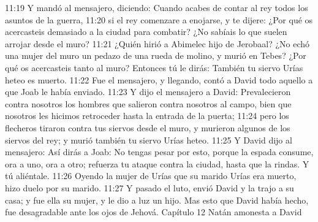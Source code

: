 11:19 Y mandó al mensajero, diciendo: Cuando acabes de contar al rey todos los asuntos de la guerra,  
11:20 si el rey comenzare a enojarse, y te dijere: ¿Por qué os acercasteis demasiado a la ciudad para combatir? ¿No sabíais lo que suelen arrojar desde el muro?  
11:21 ¿Quién hirió a Abimelec hijo de Jerobaal? ¿No echó una mujer del muro un pedazo de una rueda de molino, y murió en Tebes? ¿Por qué os acercasteis tanto al muro? Entonces tú le dirás: También tu siervo Urías heteo es muerto.  
11:22 Fue el mensajero, y llegando, contó a David todo aquello a que Joab le había enviado.  
11:23 Y dijo el mensajero a David: Prevalecieron contra nosotros los hombres que salieron contra nosotros al campo, bien que nosotros les hicimos retroceder hasta la entrada de la puerta;  
11:24 pero los flecheros tiraron contra tus siervos desde el muro, y murieron algunos de los siervos del rey; y murió también tu siervo Urías heteo.  
11:25 Y David dijo al mensajero: Así dirás a Joab: No tengas pesar por esto, porque la espada consume, ora a uno, ora a otro; refuerza tu ataque contra la ciudad, hasta que la rindas. Y tú aliéntale.  
11:26 Oyendo la mujer de Urías que su marido Urías era muerto, hizo duelo por su marido.  
11:27 Y pasado el luto, envió David y la trajo a su casa; y fue ella su mujer, y le dio a luz un hijo. Mas esto que David había hecho, fue desagradable ante los ojos de Jehová.  
Capítulo 12 
Natán amonesta a David  

